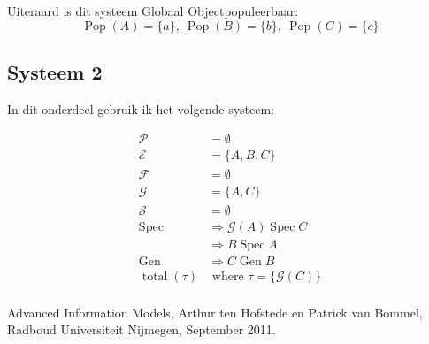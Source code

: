 \documentclass{article}
\newcommand{\Spec}{\ensuremath{\operatorname{Spec}}}
\newcommand{\Gen}{\ensuremath{\operatorname{Gen}}}
\newcommand{\total}{\ensuremath{\operatorname{total}}}
\newcommand{\Pop}{\ensuremath{\operatorname{Pop}}}
\begin{document}
Uiteraard is dit systeem Globaal Objectpopuleerbaar: 
\[ \Pop (A) = \{a\},\  \Pop (B) = \{b\},\  \Pop (C)= \{c\} \]

\subsection{Systeem 2}

In dit onderdeel gebruik ik het volgende systeem: 

\begin{align*}
  \mathcal{P}   & = \emptyset                               \\
  \mathcal{E}   & = \{A, B, C\}                             \\
  \mathcal{F}   & = \emptyset                               \\
  \mathcal{G}   & = \{A, C\}                                \\
  \mathcal{S}   & = \emptyset                               \\
  \Spec         & \Rightarrow \mathcal{G} (A) \Spec C       \\
                & \Rightarrow B \Spec A                     \\
  \Gen          & \Rightarrow C \Gen B                      \\
  \total (\tau) & \text{ where } \tau = \{\mathcal{G} (C)\} \\
\end{align*}



\begin{thebibliography}{9}
    Advanced Information Models, 
    Arthur ten Hofstede en Patrick van Bommel,
    Radboud Universiteit Nijmegen,
    September 2011.
\end{thebibliography}
\end{document}
